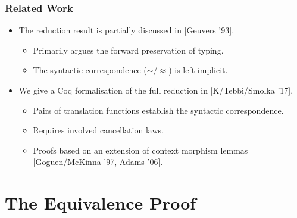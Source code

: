 \documentclass[english,pdftex,dvipsnames,leqno,handout]{beamer}%
\newcommand{\mycite}[1]{{\color{greenblue}\scriptsize[#1]}}
\begin{document}
\begin{frame}
  \frametitle{Related Work}
  \pause
  \begin{itemize}
  \item The reduction result is partially discussed in \mycite{Geuvers '93}.
    \begin{itemize}
    \item Primarily argues the forward preservation of typing.
    \item The syntactic correspondence ($\sim$/$\approx$) is left implicit.
    \end{itemize}\pause
  \item We give a Coq formalisation of the full reduction in \mycite{K/Tebbi/Smolka '17}.
    \begin{itemize}
    \item Pairs of translation functions establish the syntactic correspondence.
    \item Requires involved cancellation laws.
    \item Proofs based on an extension of context morphism lemmas \mycite{Goguen/McKinna '97, Adams '06}.
    \end{itemize}
  \end{itemize}
\end{frame}

\section{The Equivalence Proof}
\end{document}
